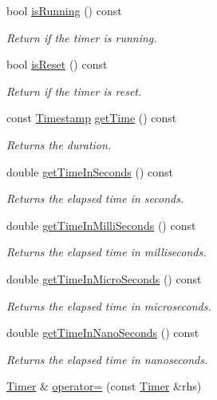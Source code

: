 \begin{DoxyCompactItemize}
bool \hyperlink{class_timer_adaa7f9265e58b38e26b14476b0374e8d}{is\+Running} () const 
\begin{DoxyCompactList}\small\item\em Return if the timer is running. \end{DoxyCompactList}\item 
bool \hyperlink{class_timer_adfcb5289466545f65ccee4ac78737f0a}{is\+Reset} () const 
\begin{DoxyCompactList}\small\item\em Return if the timer is reset. \end{DoxyCompactList}\item 
const \hyperlink{class_timestamp}{Timestamp} \hyperlink{class_timer_a7958b8b64dc25572a69d5cdcb93dd86a}{get\+Time} () const 
\begin{DoxyCompactList}\small\item\em Returns the duration. \end{DoxyCompactList}\item 
double \hyperlink{class_timer_a17668de61cdcf85572dd93dfcb5c588d}{get\+Time\+In\+Seconds} () const 
\begin{DoxyCompactList}\small\item\em Returns the elapsed time in seconds. \end{DoxyCompactList}\item 
double \hyperlink{class_timer_adaa5408463cc315a7e73fe8fc16b1555}{get\+Time\+In\+Milli\+Seconds} () const 
\begin{DoxyCompactList}\small\item\em Returns the elapsed time in milliseconds. \end{DoxyCompactList}\item 
double \hyperlink{class_timer_afb1ad817cee7e91d7ecc844c8ec968d6}{get\+Time\+In\+Micro\+Seconds} () const 
\begin{DoxyCompactList}\small\item\em Returns the elapsed time in microseconds. \end{DoxyCompactList}\item 
double \hyperlink{class_timer_adc1a77beae35658f37aa45b3340fb2ba}{get\+Time\+In\+Nano\+Seconds} () const 
\begin{DoxyCompactList}\small\item\em Returns the elapsed time in nanoseconds. \end{DoxyCompactList}\item 
\hyperlink{class_timer}{Timer} \& \hyperlink{class_timer_ac944712dc0b1f001270aad345e04e872}{operator=} (const \hyperlink{class_timer}{Timer} \&rhs)

\end{DoxyCompactItemize}

